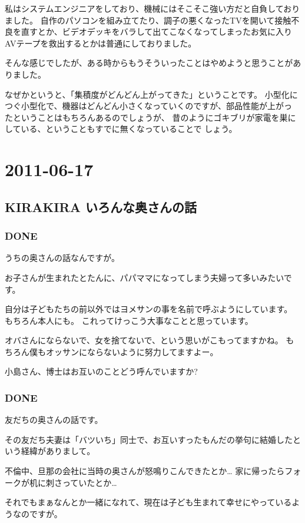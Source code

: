 \documentclass[11pt]{article}
\begin{document}
私はシステムエンジニアをしており、機械にはそこそこ強い方だと自負しておりました。
自作のパソコンを組み立てたり、調子の悪くなったTVを開いて接触不良を直すとか、ビデオデッキをバラして出てこなくなってしまったお気に入りAVテープを救出するとかは普通にしておりました。

そんな感じでしたが、ある時からもうそういったことはやめようと思うことがありました。

なぜかというと、「集積度がどんどん上がってきた」ということです。
小型化につぐ小型化で、機器はどんどん小さくなっていくのですが、部品性能が上がっ
たということはもちろんあるのでしょうが、
昔のようにゴキブリが家電を巣にしている、ということもすでに無くなっていることで
しょう。
\section{2011-06-17}
\label{sec-107}
\subsection{KIRAKIRA いろんな奥さんの話}
\label{sec-107_1}
\subsubsection{\textbf{DONE}}
\label{sec-107_1_1}

うちの奥さんの話なんですが。

お子さんが生まれたとたんに、パパママになってしまう夫婦って多いみたいです。

自分は子どもたちの前以外ではヨメサンの事を名前で呼ぶようにしています。
もちろん本人にも。
これってけっこう大事なことと思っています。

オバさんにならないで、女を捨てないで、という思いがこもってますかね。
もちろん僕もオッサンにならないように努力してますよー。

小島さん、博士はお互いのことどう呼んでいますか?
\subsubsection{\textbf{DONE}}
\label{sec-107_1_2}

友だちの奥さんの話です。

その友だち夫妻は「バツいち」同士で、お互いすったもんだの挙句に結婚したという経緯がありまして。

不倫中、旦那の会社に当時の奥さんが怒鳴りこんできたとか\ldots{}
家に帰ったらフォークが机に刺さっていたとか\ldots{}

それでもまぁなんとか一緒になれて、現在は子ども生まれて幸せにやっているようなのですが。
\end{document}
